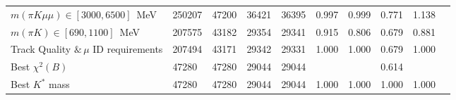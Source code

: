 \begin{table}[ht!]
\begin{tabular}{l | l l| l l| l l| l |ll }
    $m(\pi K \mu\mu) \in [3000,6500]$~MeV& 250207 & 47200 & 36421 & 36395 & 0.997 & 0.999 & 0.771 & 1.138\\
    $m(\pi K) \in [690,1100]$~MeV& 207575 & 43182 & 29354 & 29341 & 0.915 & 0.806 & 0.679 & 0.881 \\
    Track Quality $\&\,\mu$ ID requirements& 207494 & 43171 & 29342 & 29331 & 1.000 & 1.000 & 0.679 & 1.000\\
    \hline
    Best $\chi^{2}(B)$& 47280 & 47280 & 29044 & 29044 &&& 0.614 &\\
    Best $K^{*}$ mass& 47280 & 47280 & 29044 & 29044 & 1.000 & 1.000 & 1.000 & 1.000\\
    \hline\hline
  \end{tabular}
  \label{tab:presel:sigmu}
\end{table}

